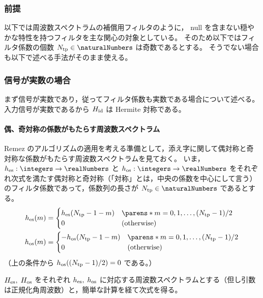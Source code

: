         \subsubsection{前提}
            以下では周波数スペクトラムの補償用フィルタのように， null を含まない穏やかな特性を持つフィルタを主な関心の対象としている。
            そのため以下ではフィルタ係数の個数 $\Ntp\in\naturalNumbers$ は奇数であるとする。
            そうでない場合も以下で述べる手法がそのまま使える。
        \subsubsection{信号が実数の場合}
            まず信号が実数であり，従ってフィルタ係数も実数である場合について述べる。
            入力信号が実数であるから $H_{\text{id}}$ は Hermite 対称である。
            \paragraph{偶、奇対称の係数がもたらす周波数スペクトラム}
                \label{偶、奇対称の係数がもたらす周波数スペクトラム}
                Remez のアルゴリズムの適用を考える準備として，添え字に関して偶対称と奇対称な係数がもたらす周波数スペクトラムを見ておく。
                いま，$\hes:\integers\to\realNumbers$ と $\hos:\integers\to\realNumbers$ をそれぞれ次式を満たす偶対称と奇対称（「対称」とは，中央の係数を中心にして言う）のフィルタ係数であって，係数列の長さが $\Ntp\in\naturalNumbers$ であるとする。
                \begin{align*}
                    \hes(m) &= \begin{cases}
                        \hes(\Ntp-1-m) & \parens*{m =0,1,\dots,(\Ntp-1)/2} \\
                        0 & (\text{otherwise})
                    \end{cases} \\
                    \hos(m) &= \begin{cases}
                        -\hos(\Ntp-1-m) & \parens*{m =0,1,\dots,(\Ntp-1)/2} \\
                        0 & (\text{otherwise})
                    \end{cases}
                \end{align*}
                （上の条件から $h_{\text{os}}((N_{\text{tp}}-1)/2) = 0$ である。）
                \par
                $H_{\text{es}},\;H_{\text{os}}$ をそれぞれ $h_{\text{es}},\;h_{\text{os}}$ に対応する周波数スペクトラムとする（但し引数は正規化角周波数）と，簡単な計算を経て次式を得る。
